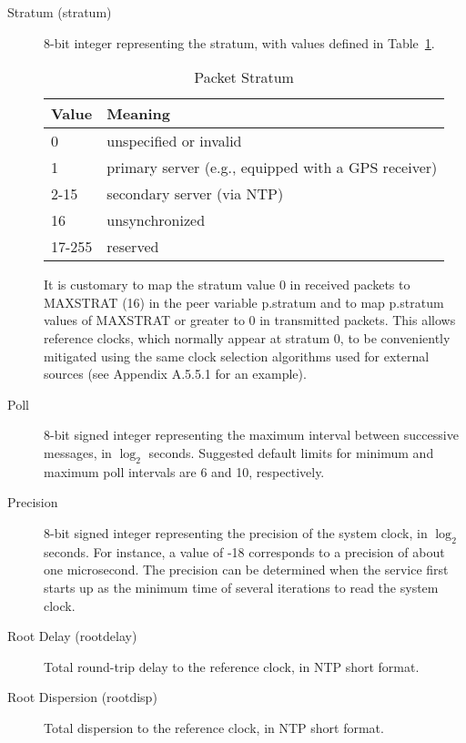 \begin{description}
  \item[Stratum (stratum)] 8-bit integer representing the stratum, with
    values defined in Table~\ref{packet_stratum}.

    \begin{table}[htb]
      \center
      \begin{tabular}{| l | l |}
        \hline
        Value & Meaning \\
        \hline
        \hline
        0 & unspecified or invalid \\
        1 & primary server (e.g., equipped with a GPS receiver) \\
        2-15 & secondary server (via NTP) \\
        16 & unsynchronized \\
        17-255 & reserved \\
        \hline
      \end{tabular}
      \caption{Packet Stratum}
      \label{packet_stratum}
    \end{table}

    It is customary to map the stratum value 0 in received packets to
    MAXSTRAT (16) in the peer variable p.stratum and to map p.stratum
    values of MAXSTRAT or greater to 0 in transmitted packets. This
    allows reference clocks, which normally appear at stratum 0, to be
    conveniently mitigated using the same clock selection algorithms used
    for external sources (see Appendix A.5.5.1 for an example).

  \item[Poll] 8-bit signed integer representing the maximum interval between
    successive messages, in $ \log_2 $ seconds. Suggested default limits for
    minimum and maximum poll intervals are 6 and 10, respectively.

  \item[Precision] 8-bit signed integer representing the precision of the
    system clock, in $ \log_2 $ seconds. For instance, a value of -18
    corresponds to a precision of about one microsecond. The precision
    can be determined when the service first starts up as the minimum
    time of several iterations to read the system clock.

  \item[Root Delay (rootdelay)] Total round-trip delay to the reference
    clock, in NTP short format.

  \item[Root Dispersion (rootdisp)] Total dispersion to the reference clock,
    in NTP short format.


\end{description}
